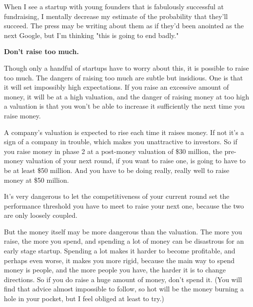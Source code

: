 When I see a startup with
                    young founders that is fabulously successful at fundraising,
                    I mentally decrease my estimate of the probability that
                    they'll succeed. The press may be writing about them as if
                    they'd been anointed as the next Google, but I'm thinking
                    "this is going to end badly."


                    \textbf{Don't raise too much.}

Though only a
                    handful of startups have to worry about this, it is possible
                    to raise too much. The dangers of raising too much are
                    subtle but insidious. One is that it will set impossibly
                    high expectations. If you raise an excessive amount of
                    money, it will be at a high valuation, and the danger of
                    raising money at too high a valuation is that you won't be
                    able to increase it sufficiently the next time you raise
                    money.

A company's valuation is expected to rise
                    each time it raises money. If not it's a sign of a company
                    in trouble, which makes you unattractive to investors. So if
                    you raise money in phase 2 at a post-money valuation of \$30
                    million, the pre-money valuation of your next round, if you
                    want to raise one, is going to have to be at least \$50
                    million. And you have to be doing really, really well to
                    raise money at \$50 million.

It's very dangerous
                    to let the competitiveness of your current round set the
                    performance threshold you have to meet to raise your next
                    one, because the two are only loosely coupled.

But
                    the money itself may be more dangerous than the valuation.
                    The more you raise, the more you spend, and spending a lot
                    of money can be disastrous for an early stage startup.
                    Spending a lot makes it harder to become profitable, and
                    perhaps even worse, it makes you more rigid, because the
                    main way to spend money is people, and the more people you
                    have, the harder it is to change directions. So if you do
                    raise a huge amount of money, don't spend it. (You will find
                    that advice almost impossible to follow, so hot will be the
                    money burning a hole in your pocket, but I feel obliged at
                    least to try.)


